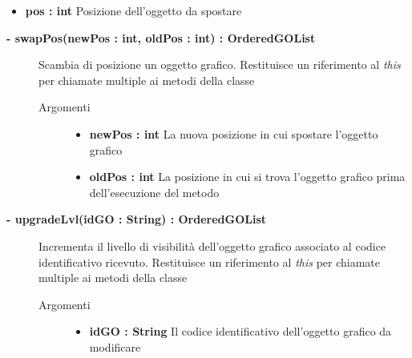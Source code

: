 \begin{description}
\begin{description}
\begin{description}
\begin{itemize}
					\item \textbf{pos : int			} \hfill
					Posizione dell'oggetto da spostare
					
				\end{itemize}
		\end{description}
	\end{description}
	
	\begin{description}
		\item[\textbf{\color{blue}- swapPos(newPos : int, oldPos : int) : OrderedGOList			}] \hfill
			Scambia di posizione un oggetto grafico. Restituisce un riferimento al \textit{this} per chiamate multiple ai metodi della classe
			
		\begin{description}
			\item[Argomenti] \hfill
				\begin{itemize}
				
					\item \textbf{newPos : int			} \hfill
					La nuova posizione in cui spostare l'oggetto grafico
					\item \textbf{oldPos : int			} \hfill
					La posizione in cui si trova l'oggetto grafico prima dell'esecuzione del metodo
					
				\end{itemize}
		\end{description}
	\end{description}
	
	\begin{description}
		\item[\textbf{\color{blue}- upgradeLvl(idGO : String) : OrderedGOList			}] \hfill
			Incrementa il livello di visibilità dell'oggetto grafico associato al codice identificativo ricevuto. Restituisce un riferimento al \textit{this} per chiamate multiple ai metodi della classe
			
		\begin{description}
			\item[Argomenti] \hfill
				\begin{itemize}
				
					\item \textbf{idGO : String			} \hfill
					Il codice identificativo dell'oggetto grafico da modificare
					
				\end{itemize}
		\end{description}
	\end{description}
	

\end{description}

